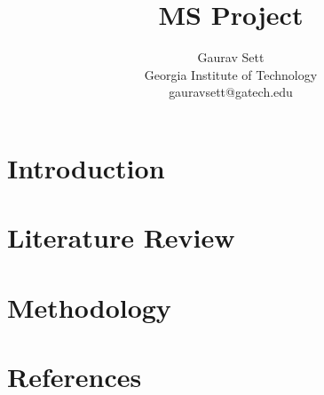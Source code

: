 \documentclass{article}
\title{MS Project}
\author{
    Gaurav Sett \\
    Georgia Institute of Technology \\
    gauravsett@gatech.edu
    }
\begin{document}
\maketitle


\begin{abstract}
\end{abstract}


\section{Introduction}


\section{Literature Review}

\cite{grice1975logic}

\section{Methodology}

\section{References}
\printbibliography[heading=none]
\end{document}
